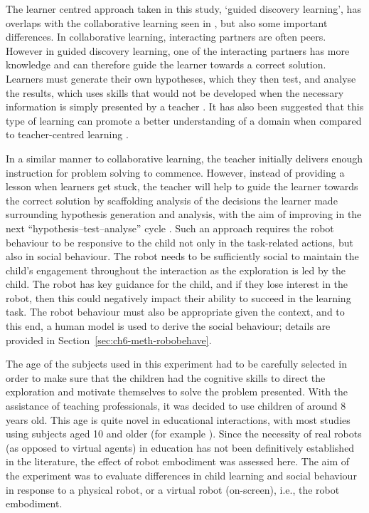 The learner centred approach taken in this study, `guided discovery learning', has overlaps with the collaborative learning seen in \cite{kanda2004interactive}, but also some important differences. In collaborative learning, interacting partners are often peers. However in guided discovery learning, one of the interacting partners has more knowledge and can therefore guide the learner towards a correct solution. Learners must generate their own hypotheses, which they then test, and analyse the results, which uses skills that would not be developed when the necessary information is simply presented by a teacher \citep{de1998scientific}. It has also been suggested that this type of learning can promote a better understanding of a domain when compared to teacher-centred learning \citep{alfieri2011does, van1998cognitive}.

In a similar manner to collaborative learning, the teacher initially delivers enough instruction for problem solving to commence. However, instead of providing a lesson when learners get stuck, the teacher will help to guide the learner towards the correct solution by scaffolding analysis of the decisions the learner made surrounding hypothesis generation and analysis, with the aim of improving in the next ``hypothesis--test--analyse'' cycle \citep{de1998scientific, harvel2010guided}. Such an approach requires the robot behaviour to be responsive to the child not only in the task-related actions, but also in social behaviour. The robot needs to be sufficiently social to maintain the child's engagement throughout the interaction as the exploration is led by the child. The robot has key guidance for the child, and if they lose interest in the robot, then this could negatively impact their ability to succeed in the learning task. The robot behaviour must also be appropriate given the context, and to this end, a human model is used to derive the social behaviour; details are provided in Section~\ref{sec:ch6-meth-robobehave}.

The age of the subjects used in this experiment had to be carefully selected in order to make sure that the children had the cognitive skills to direct the exploration and motivate themselves to solve the problem presented. With the assistance of teaching professionals, it was decided to use children of around 8 years old. This age is quite novel in educational interactions, with most studies using subjects aged 10 and older (for example \citealp{kanda2012children, leyzberg2014personalizing, pereira2008icat, saerbeck2010expressive}). Since the necessity of real robots (as opposed to virtual agents) in education has not been definitively established in the literature, the effect of robot embodiment was assessed here. The aim of the experiment was to evaluate differences in child \gls{learning} and social behaviour in response to a physical robot, or a virtual robot (on-screen), i.e., the robot embodiment.

